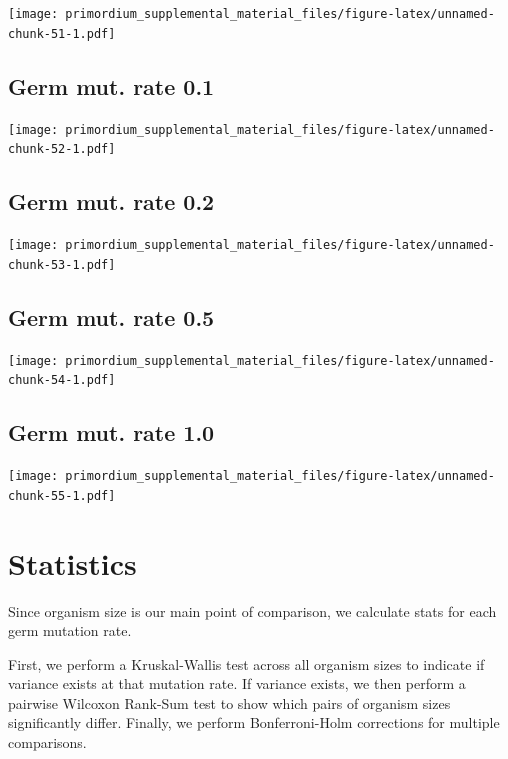 \documentclass[
]{book}
\begin{document}
\texttt{[image: primordium\_supplemental\_material\_files/figure-latex/unnamed-chunk-51-1.pdf]}

\hypertarget{germ-mut.-rate-0.1}{%
\subsection{Germ mut. rate 0.1}\label{germ-mut.-rate-0.1}}

\texttt{[image: primordium\_supplemental\_material\_files/figure-latex/unnamed-chunk-52-1.pdf]}

\hypertarget{germ-mut.-rate-0.2}{%
\subsection{Germ mut. rate 0.2}\label{germ-mut.-rate-0.2}}

\texttt{[image: primordium\_supplemental\_material\_files/figure-latex/unnamed-chunk-53-1.pdf]}

\hypertarget{germ-mut.-rate-0.5}{%
\subsection{Germ mut. rate 0.5}\label{germ-mut.-rate-0.5}}

\texttt{[image: primordium\_supplemental\_material\_files/figure-latex/unnamed-chunk-54-1.pdf]}

\hypertarget{germ-mut.-rate-1.0}{%
\subsection{Germ mut. rate 1.0}\label{germ-mut.-rate-1.0}}

\texttt{[image: primordium\_supplemental\_material\_files/figure-latex/unnamed-chunk-55-1.pdf]}

\hypertarget{statistics-2}{%
\section{Statistics}\label{statistics-2}}

Since organism size is our main point of comparison, we calculate stats for each germ mutation rate.

First, we perform a Kruskal-Wallis test across all organism sizes to indicate if variance exists at that mutation rate.
If variance exists, we then perform a pairwise Wilcoxon Rank-Sum test to show which pairs of organism sizes significantly differ.
Finally, we perform Bonferroni-Holm corrections for multiple comparisons.
\end{document}
